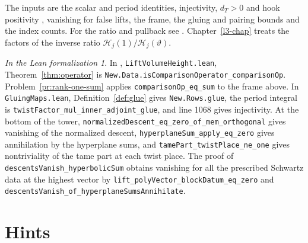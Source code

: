 \documentclass[reqno]{amsart}
\newcounter{chap}
\theoremstyle{definition}
\theoremstyle{plain}
\theoremstyle{remark}
\newtheorem*{leanremark}{In the Lean formalization}
\newcommand{\Hc}{{\mathcal{H}}}
\newcommand{\vt}{\vartheta}
\newcommand{\tl}[1]{\texttt{#1}}
\begin{document}
The inputs are the scalar and period identities, injectivity, \(d_T>0\) and hook positivity \cite[WeylKernel, line 57]{GL}, vanishing for false lifts, the frame, the gluing and pairing bounds and the index counts.  For the ratio and pullback see \cite[LiftVolumeHeight, lines 207--243]{GL}.  Chapter~\ref{l3-chap} treats the factors of the inverse ratio \(\Hc_j(1)/\Hc_j(\vt)\).

\begin{leanremark}
\raggedright In \cite{GL}, \tl{LiftVolumeHeight.lean}, Theorem~\ref{thm:operator} is \tl{New.Data.isComparisonOperator\_comparisonOp}.  Problem~\ref{pr:rank-one-sum} applies \tl{comparisonOp\_eq\_sum} to the frame above.  In \tl{GluingMaps.lean}, Definition~\ref{def:glue} gives \tl{New.Rows.glue}, the period integral is \tl{twistFactor\_mul\_inner\_adjoint\_glue}, and line 1068 gives injectivity.  At the bottom of the tower, \tl{normalizedDescent\_eq\_zero\_of\_mem\_orthogonal} gives vanishing of the normalized descent, \tl{hyperplaneSum\_apply\_eq\_zero} gives annihilation by the hyperplane sums, and \tl{tamePart\_twistPlace\_ne\_one} gives nontriviality of the tame part at each twist place.  The proof of \tl{descentsVanish\_hyperbolicSum} obtains vanishing for all the prescribed Schwartz data at the highest vector by \tl{lift\_polyVector\_blockDatum\_eq\_zero} and \tl{descentsVanish\_of\_hyperplaneSumsAnnihilate}.
\end{leanremark}

\section*{Hints}
\end{document}
